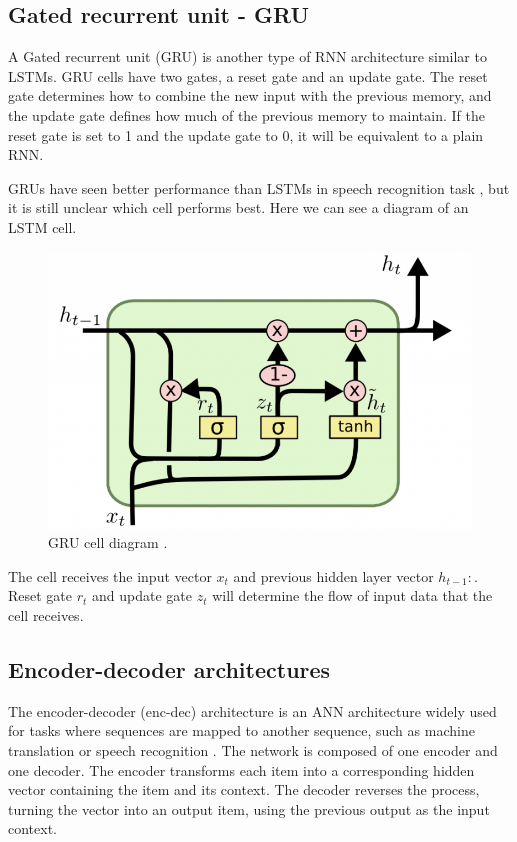 \documentclass{tex_files/kththesis}
\begin{document}
\subsection{Gated recurrent unit - GRU}
A Gated recurrent unit (GRU) \cite{gru} is another type of RNN architecture similar to LSTMs. GRU cells have two gates, a reset gate \cite{gru-forget} and an update gate. The reset gate determines how to combine the new input with the previous memory, and the update gate defines how much of the previous memory to maintain. If the reset gate is set to 1 and the update gate to 0, it will be equivalent to a plain RNN.

GRUs have seen better performance than LSTMs in speech recognition task \cite{gru-speech}, but it is still unclear which cell performs best. Here we can see a diagram of an LSTM cell. 

\begin{figure}[H]
    \centering
    \includegraphics[scale=0.6]{images/background/GRU-core.png}
    \caption{GRU cell diagram \cite{daniel}.}
    
\end{figure}

The cell receives the input vector $x_{t}$ and previous hidden layer vector $h_{t-1}:$. Reset gate $r_t$ and update gate $z_t$ will determine the flow of input data that the cell receives.

\subsection{Encoder-decoder architectures}
The encoder-decoder (enc-dec) architecture is an ANN architecture widely used for tasks where sequences are mapped to another sequence, such as machine translation or speech recognition \cite{encoder-decoder}. The network is composed of one encoder and one decoder. The encoder transforms each item into a corresponding hidden vector containing the item and its context. The decoder reverses the process, turning the vector into an output item, using the previous output as the input context.
\end{document}
